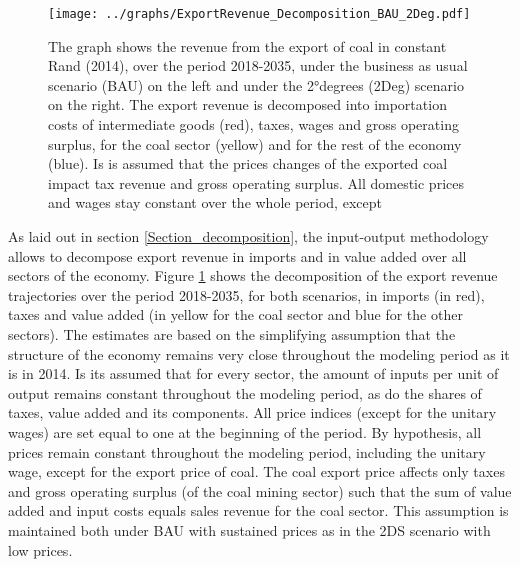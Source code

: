 \documentclass[12pt,english]{article}
\begin{document}
\begin{figure}[!b]
	\hspace{-10pt}\texttt{[image: ../graphs/ExportRevenue\_Decomposition\_BAU\_2Deg.pdf]}
	\caption{\label{ExportRevenue_Decomposition_Diff}\small The graph shows the revenue from the export of coal in constant Rand (2014), over the period 2018-2035, under the business as usual scenario (BAU) on the left and under the 2°degrees (2Deg) scenario on the right. The export revenue is decomposed into importation costs of intermediate goods (red), taxes, wages and gross operating surplus, for the coal sector (yellow) and for the rest of the economy (blue). Is is assumed that the prices changes of the exported coal impact tax revenue and gross operating surplus. All domestic prices and wages stay constant over the whole period, except  }
\end{figure}

As laid out in section \ref{Section_decomposition}, the input-output methodology allows to decompose export revenue in imports and in value added over all sectors of the economy. Figure \ref{ExportRevenue_Decomposition_Diff} shows the decomposition of the export revenue trajectories over the period 2018-2035, for both scenarios, in imports (in red), taxes and value added (in yellow for the coal sector and blue for the other sectors). %
The estimates are based on the simplifying assumption that the structure of the economy remains very close throughout the modeling period as it is in 2014. Is its assumed that for every sector, the amount of inputs per unit of output remains constant throughout the modeling period, as do the shares of taxes, value added and its components. All price indices (except for the unitary wages) are set equal to one at the beginning of the period. By hypothesis, all prices remain constant throughout the modeling period, including the unitary wage, except for the export price of coal.
The coal export price affects only taxes and gross operating surplus (of the coal mining sector)%
such that the sum of value added and input costs equals sales revenue for the coal sector. This assumption is maintained both under BAU with sustained prices as in the 2DS scenario with low prices. 
\end{document}
